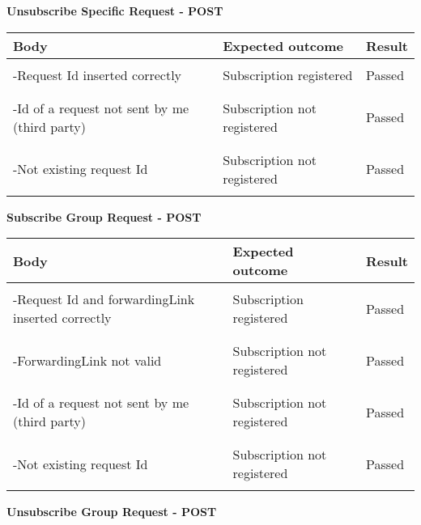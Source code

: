 \textbf{Unsubscribe Specific Request - POST}
\begin{center}
	\begin{tabular}{|p{}|p{}|p{}|}
		\hline
		Body & Expected outcome & Result \\
		\hline
		&&\\
		-Request Id inserted correctly&Subscription registered&Passed\\
		&&\\
		\hline
		&&\\
		-Id of a request not sent by me (third party)&Subscription not registered&Passed\\
		&&\\
		\hline
		&&\\
		-Not existing request Id &Subscription not registered&Passed\\
		&&\\
		\hline
	\end{tabular}
\end{center}
\textbf{Subscribe Group Request - POST}
\begin{center}
	\begin{tabular}{|p{}|p{}|p{}|}
		\hline
		Body & Expected outcome & Result \\
		\hline
		&&\\
		-Request Id and forwardingLink inserted correctly&Subscription registered&Passed\\
		&&\\
		\hline
		&&\\
		-ForwardingLink not valid &Subscription not registered&Passed\\
		&&\\
		\hline
		&&\\
		-Id of a request not sent by me (third party)&Subscription not registered&Passed\\
		&&\\
		\hline
		&&\\
		-Not existing request Id &Subscription not registered&Passed\\
		&&\\
		\hline
	\end{tabular}
\end{center}
\textbf{Unsubscribe Group Request - POST}
